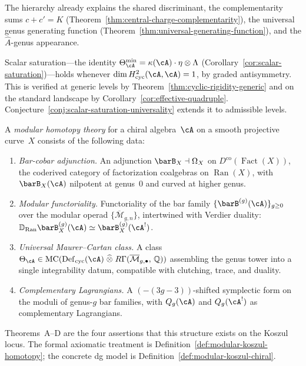 The hierarchy already explains the shared discriminant, the
complementarity sums $c + c' = K$
(Theorem~\ref{thm:central-charge-complementarity}), the universal
genus generating function
(Theorem~\ref{thm:universal-generating-function}), and the
$\hat{A}$-genus appearance.

Scalar saturation---the identity
$\Theta_\cA^{\min} = \kappa(\cA) \cdot \eta \otimes \Lambda$
(Corollary~\ref{cor:scalar-saturation})---holds whenever
$\dim H^2_{\mathrm{cyc}}(\cA,\cA) = 1$, by graded antisymmetry.
This is verified at generic levels by
Theorem~\ref{thm:cyclic-rigidity-generic} and on the standard
landscape by Corollary~\ref{cor:effective-quadruple}.
Conjecture~\ref{conj:scalar-saturation-universality} extends it
to admissible levels.

\begin{definition}
\label{def:modular-homotopy-theory-intro}
A \emph{modular homotopy theory} for a chiral algebra~$\cA$
on a smooth projective curve~$X$ consists of the following data:
\begin{enumerate}[label=\textup{(\roman*)}]
\item \emph{Bar-cobar adjunction.}
  An adjunction
  $\barB_X \dashv \Omega_X$ on
  $D^{\mathrm{co}}(\operatorname{Fact}(X))$, the coderived
  category of factorization coalgebras on
  $\operatorname{Ran}(X)$, with $\barB_X(\cA)$ nilpotent at
  genus~$0$ and curved at higher genus.
\item \emph{Modular functoriality.}
  Functoriality of the bar family
  $\{\barB^{(g)}(\cA)\}_{g \geq 0}$ over the modular operad
  $\{\overline{\mathcal{M}}_{g,n}\}$, intertwined with Verdier
  duality:
  $\mathbb{D}_{\operatorname{Ran}}\barB^{(g)}_X(\cA)
  \simeq \barB^{(g)}_X(\cA^!)$.
\item \emph{Universal Maurer--Cartan class.}
  A class
  $\Theta_\cA \in
  \operatorname{MC}(\operatorname{Def}_{\mathrm{cyc}}(\cA)
  \;\widehat{\otimes}\;
  R\Gamma(\overline{\mathcal{M}}_{g,\bullet},\,
  \mathbb{Q}))$
  assembling the genus tower into a single integrability datum,
  compatible with clutching, trace, and duality.
\item \emph{Complementary Lagrangians.}
  A $(-(3g{-}3))$-shifted symplectic form on the moduli of
  genus-$g$ bar families, with
  $Q_g(\cA)$ and $Q_g(\cA^!)$ as complementary Lagrangians.
\end{enumerate}
Theorems~A--D are the four assertions that this structure exists on the
Koszul locus.  The formal axiomatic treatment is
Definition~\ref{def:modular-koszul-homotopy}; the concrete dg model is
Definition~\ref{def:modular-koszul-chiral}.
\end{definition}


